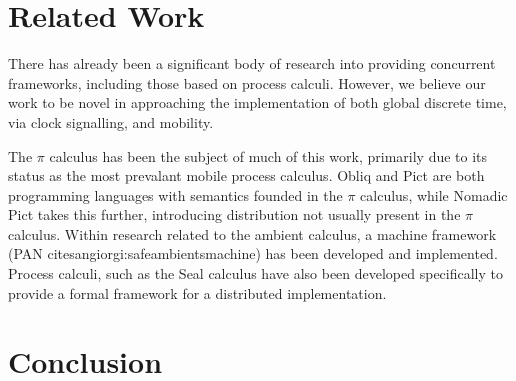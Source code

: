 \section{Related Work}
\label{dyn:relatedwork}

There has already been a significant body of research into providing
concurrent frameworks, including those based on process calculi.
However, we believe our work to be novel in approaching the
implementation of both global discrete time, via clock signalling, and
mobility.

The $\pi$ calculus has been the subject of much of this work, primarily
due to its status as the most prevalant mobile process calculus.  Obliq
\cite{obliq} and Pict \cite{daveturner:phd} are both programming
languages with semantics founded in the $\pi$ calculus, while Nomadic
Pict \cite{wojciechowski:phd} takes this further, introducing
distribution not usually present in the $\pi$ calculus.  Within research
related to the ambient calculus, a machine framework (PAN
cite{sangiorgi:safeambientsmachine}) has been developed and
implemented.  Process calculi, such as the Seal calculus \cite{seal}
have also been developed specifically to provide a formal framework for
a distributed implementation.

\section{Conclusion}
